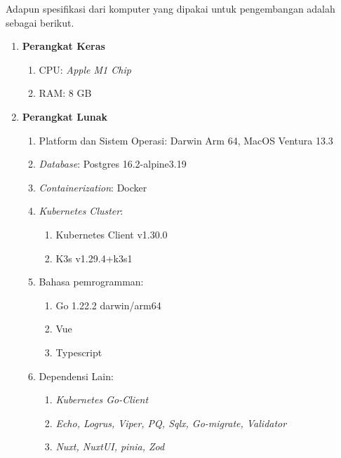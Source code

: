 Adapun spesifikasi dari komputer yang dipakai untuk pengembangan adalah sebagai berikut.
\begin{enumerate}
  \item \textbf{Perangkat Keras}

        \begin{enumerate}
          \item CPU: \textit{Apple M1 Chip}
          \item RAM: 8 GB
        \end{enumerate}

  \item \textbf{Perangkat Lunak}

        \begin{enumerate}
          \item Platform dan Sistem Operasi: Darwin Arm 64, MacOS Ventura 13.3
          \item \textit{Database}: Postgres 16.2-alpine3.19
          \item \textit{Containerization}: Docker
          \item \textit{Kubernetes Cluster}:
                \begin{enumerate}
                  \item Kubernetes Client v1.30.0
                  \item K3s v1.29.4+k3s1
                \end{enumerate}
          \item Bahasa pemrogramman:
                \begin{enumerate}
                  \item Go 1.22.2 darwin/arm64
                  \item Vue
                  \item Typescript
                \end{enumerate}
          \item Dependensi Lain:
                \begin{enumerate}
                  \item \textit{Kubernetes Go-Client}
                  \item \textit{Echo, Logrus, Viper, PQ, Sqlx, Go-migrate, Validator}
                  \item \textit{Nuxt, NuxtUI, pinia, Zod}
                \end{enumerate}
        \end{enumerate}
\end{enumerate}